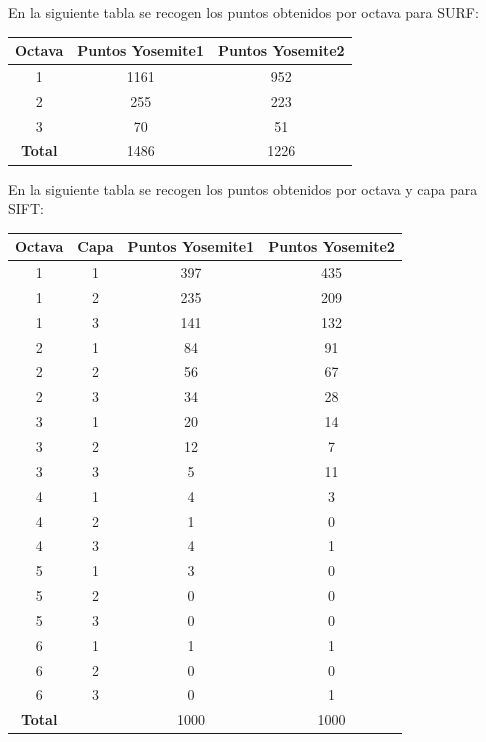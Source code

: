 \documentclass[12pt,spanish]{article} %
\begin{document}
En la siguiente tabla se recogen los puntos obtenidos por octava para SURF:

\begin{center}
 \begin{tabular}{|| c | c | c ||} 
 \hline
 \rule{0cm}{0.5cm}
 \textbf{Octava} & \textbf{Puntos Yosemite1} & \textbf{Puntos Yosemite2}  \\
 \hline\hline
 1 & 1161 & 952 \\ 
 \hline
 2 & 255 & 223 \\ 
 \hline
 3 & 70 & 51 \\ 
 \hline\hline
 \textbf{Total} & 1486 & 1226 \\ 
 \hline
\end{tabular}
\end{center}

\newpage

En la siguiente tabla se recogen los puntos obtenidos por octava y capa para SIFT:

\begin{center}
 \begin{tabular}{|| c | c | c | c ||} 
 \hline
 \rule{0cm}{0.5cm}
 \textbf{Octava} & \textbf{Capa} & \textbf{Puntos Yosemite1} & \textbf{Puntos Yosemite2}  \\
 \hline\hline
  1 & 1 & 397 & 435 \\
 \hline
  1 & 2 & 235 & 209 \\
 \hline
  1 & 3 & 141 & 132 \\
  \hline\hline
  2 & 1 & 84 & 91 \\
 \hline
  2 & 2 & 56 & 67 \\
 \hline
  2 & 3 & 34 & 28 \\
  \hline\hline
  3 & 1 & 20 & 14 \\
 \hline
  3 & 2 & 12 & 7 \\
 \hline
  3 & 3 & 5 & 11 \\
  \hline\hline
  4 & 1 & 4 & 3 \\
 \hline
  4 & 2 & 1 & 0 \\
 \hline
  4 & 3 & 4 & 1 \\
  \hline\hline
  5 & 1 & 3 & 0 \\
 \hline
  5 & 2 & 0 & 0 \\
 \hline
  5 & 3 & 0 & 0 \\
  \hline\hline
  6 & 1 & 1 & 1 \\
 \hline
  6 & 2 & 0 & 0 \\
 \hline
  6 & 3 & 0 & 1 \\
  \hline\hline
 \textbf{Total} & & 1000 & 1000 \\ 
 \hline
\end{tabular}
\end{center}
\end{document}
